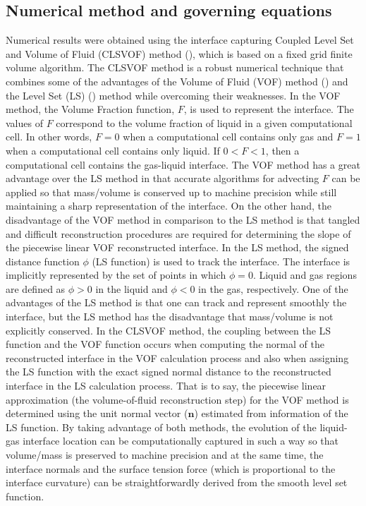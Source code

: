 \documentclass{elsarticle}
\begin{document}
\subsection{Numerical method and governing equations}
Numerical results were obtained using the interface capturing
Coupled Level Set and Volume of Fluid (CLSVOF) method
(\citet{SusPuc00,SusSmiHusOhtZhi07}), which is based on a fixed grid finite volume
algorithm.  The CLSVOF method is a robust  numerical  technique
that  combines  some  of  the  advantages  of the Volume of Fluid (VOF) method
(\citet{HirNic81}) and the Level Set (LS) (\citet{SusSmeOsh94}) method while
overcoming their weaknesses.  In the VOF method,  the Volume Fraction function,
$F$, is used to represent the interface. The values of $F$ correspond to the
volume fraction of liquid in a given computational cell.  In other words, $F =
0$ when a computational cell contains only gas and $F = 1$ when a computational
cell contains only liquid.  If $0 < F < 1$, then a computational cell contains
the gas-liquid interface. The VOF method has a great advantage over the LS
method in that accurate algorithms for advecting $F$ can be applied so that
mass/volume is conserved up to machine precision while still maintaining a
sharp representation of the interface.  On the other hand, the disadvantage of
the VOF method in comparison to the LS method is that tangled and difficult
reconstruction procedures are required for determining the slope of the
piecewise linear VOF reconstructed interface.  In the LS method, the signed
distance function $\phi$ (LS function) is used to track the interface. The
interface is implicitly represented by the set of points in which $\phi = 0$.
Liquid and gas regions are defined as $\phi > 0$ in the liquid and $\phi < 0$
in the gas, respectively.  One of the advantages of the LS method is that one
can track and represent smoothly the interface, but the LS method has the
disadvantage that mass/volume is not explicitly conserved.  In the CLSVOF
method, the coupling between the LS function and the VOF function occurs when
computing the normal of the reconstructed interface in the VOF calculation
process and also when assigning the LS function with the exact signed normal
distance to the reconstructed interface in the LS calculation process. That is
to say, the piecewise linear approximation (the volume-of-fluid reconstruction
step) for the VOF method is determined using the unit normal vector ($\bm n$)
estimated from information of the LS function. By taking advantage of both
methods, the evolution of the liquid-gas interface location can be
computationally captured in such a way so that volume/mass is preserved to
machine precision and at the same time, the interface normals and the surface
tension force (which is proportional to the interface curvature) can be
straightforwardly derived from the smooth level set function.
\end{document}
